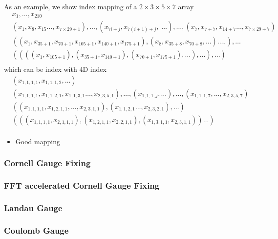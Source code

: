 As an example, we show index mapping of a $2\times 3\times 5 \times 7$ array
\begin{equation}
\begin{split}
&x_1,\ldots, x_{210}\\
&(x_1,x_8,x_{15}\ldots ,x_{7\times 29+1}),\ldots,(x_{7i+j},x_{7(i+1)+j},\;\ldots),\ldots , (x_{7},x_{7+7},x_{14+7}\ldots,x_{7\times 29+7})\\
&((x_1,x_{35+1},x_{70+1},x_{105+1},x_{140+1},x_{175+1}),(x_{8},x_{35+8},x_{70+8},\ldots)\ldots,),\ldots\\
&((((x_1,x_{105+1}),(x_{35+1},x_{140+1}),(x_{70+1},x_{175+1}),\ldots ),\ldots ),\ldots )\\
\end{split}
\end{equation}
which can be index with 4D index
\begin{equation}
\begin{split}
&(x_{1,1,1,1},x_{1,1,1,2},\ldots)\\
&(x_{1,1,1,1},x_{1,1,2,1},x_{1,1,3,1}\ldots ,x_{2,3,5,1}),\ldots,(x_{1,1,1,j},\ldots),\ldots ,(x_{1,1,1,7},\ldots,x_{2,3,5,7})\\
&((x_{1,1,1,1},x_{1,2,1,1},\ldots, x_{2,3,1,1}),(x_{1,1,2,1}\ldots ,x_{2,3,2,1}),\ldots)\\
&(((x_{1,1,1,1},x_{2,1,1,1}),(x_{1,2,1,1},x_{2,2,1,1}),(x_{1,3,1,1},x_{2,3,1,1}))\ldots)\\
\end{split}
\end{equation}

\begin{itemize}
  \item Good mapping
\end{itemize}

\subsubsection{\label{sec:CornellGaugeFixing}Cornell Gauge Fixing}

\subsubsection{\label{sec:FFTCornellGaugeFixing}FFT accelerated Cornell Gauge Fixing}

\subsubsection{\label{sec:LandauGauge}Landau Gauge}

\subsubsection{\label{sec:CoulombGauge}Coulomb Gauge} 